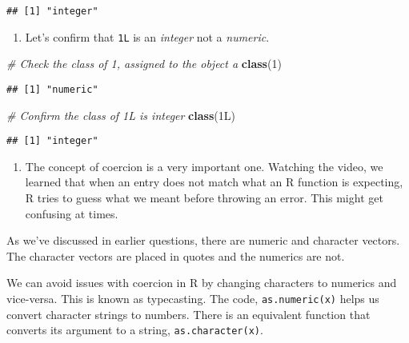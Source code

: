 \documentclass[]{article}
\newenvironment{Shaded}{\begin{snugshade}}{\end{snugshade}}
\newcommand{\CommentTok}[1]{\textcolor[rgb]{0.56,0.35,0.01}{\textit{#1}}}
\newcommand{\DecValTok}[1]{\textcolor[rgb]{0.00,0.00,0.81}{#1}}
\newcommand{\KeywordTok}[1]{\textcolor[rgb]{0.13,0.29,0.53}{\textbf{#1}}}
\newcommand{\NormalTok}[1]{#1}
\providecommand{\tightlist}{%
  \setlength{\itemsep}{0pt}\setlength{\parskip}{0pt}}
\begin{document}
\begin{verbatim}
## [1] "integer"
\end{verbatim}

\begin{enumerate}
\def\labelenumi{\arabic{enumi}.}
\setcounter{enumi}{10}
\tightlist
\item
  Let's confirm that \texttt{1L} is an \emph{integer} not a
  \emph{numeric}.
\end{enumerate}

\begin{Shaded}
\begin{Highlighting}[]
\CommentTok{# Check the class of 1, assigned to the object a}
\KeywordTok{class}\NormalTok{(}\DecValTok{1}\NormalTok{)}
\end{Highlighting}
\end{Shaded}

\begin{verbatim}
## [1] "numeric"
\end{verbatim}

\begin{Shaded}
\begin{Highlighting}[]
\CommentTok{# Confirm the class of 1L is integer}
\KeywordTok{class}\NormalTok{(1L)}
\end{Highlighting}
\end{Shaded}

\begin{verbatim}
## [1] "integer"
\end{verbatim}

\begin{enumerate}
\def\labelenumi{\arabic{enumi}.}
\setcounter{enumi}{11}
\tightlist
\item
  The concept of coercion is a very important one. Watching the video,
  we learned that when an entry does not match what an R function is
  expecting, R tries to guess what we meant before throwing an error.
  This might get confusing at times.
\end{enumerate}

As we've discussed in earlier questions, there are numeric and character
vectors. The character vectors are placed in quotes and the numerics are
not.

We can avoid issues with coercion in R by changing characters to
numerics and vice-versa. This is known as typecasting. The code,
\texttt{as.numeric(x)} helps us convert character strings to numbers.
There is an equivalent function that converts its argument to a string,
\texttt{as.character(x)}.
\end{document}

